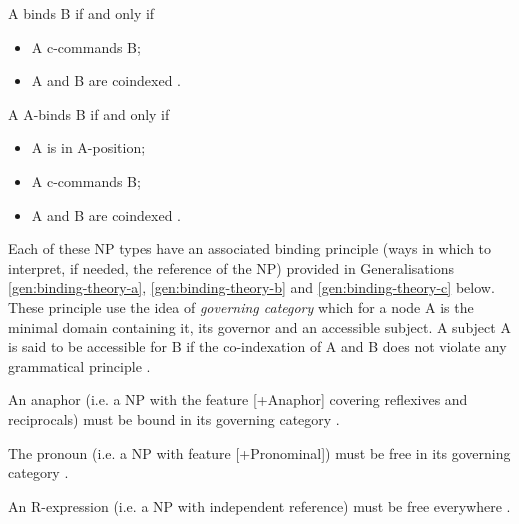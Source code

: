 \begin{definition}[Binding]\label{def:binding}
    A binds B if and only if
    \begin{itemize}
        \item A c-commands B;
        \item A and B are coindexed \citep[212]{Haegeman1991}.
    \end{itemize}
\end{definition}

\begin{definition}[A-Binding]\label{def:a-binding}
    A A-binds B if and only if
    \begin{itemize}
        \item A is in A-position;
        \item A c-commands B;
        \item A and B are coindexed \citep[240]{Haegeman1991}.
    \end{itemize}
\end{definition}

Each of these NP types have an associated binding principle (ways in which to interpret, if needed, the reference of the NP) provided in Generalisations \ref{gen:binding-theory-a}, \ref{gen:binding-theory-b} and \ref{gen:binding-theory-c} below. These principle use the idea of \textit{governing category} which for a node A is the minimal domain containing it, its governor and an accessible subject. A subject A is said to be accessible for B if the co-indexation of A and B does not violate any grammatical principle \citep[241]{Haegeman1991}.

\begin{generalization}\label{gen:binding-theory-a}
    An anaphor (i.e. a NP with the feature [+Anaphor] covering reflexives and reciprocals) must be bound in its governing category \citep[224]{Haegeman1991}.
\end{generalization}

\begin{generalization}\label{gen:binding-theory-b}
    The pronoun (i.e. a NP with feature [+Pronominal]) must be free in its governing category \citep[225]{Haegeman1991}.
\end{generalization}

\begin{generalization}\label{gen:binding-theory-c}
    An R-expression (i.e. a NP with independent reference) must be free everywhere \citep[227]{Haegeman1991}.
\end{generalization}


